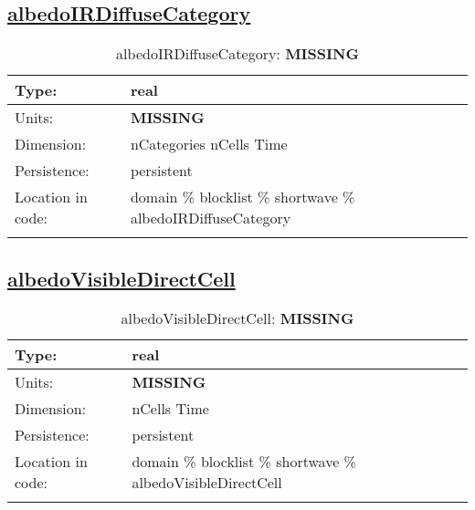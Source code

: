 \subsection[albedoIRDiffuseCategory]{\hyperref[sec:var_tab_shortwave]{albedoIRDiffuseCategory}}
\label{subsec:var_sec_shortwave_albedoIRDiffuseCategory}
\begin{center}
\begin{longtable}{| p{2.0in} | p{4.0in} |}
        \hline 
        Type: & real \\
        \hline 
        Units: & {\bf \color{red} MISSING} \\
        \hline 
        Dimension: & nCategories nCells Time \\
        \hline 
        Persistence: & persistent \\
        \hline 
         Location in code: & domain \% blocklist \% shortwave \% albedoIRDiffuseCategory \\
         \hline 
    \caption{albedoIRDiffuseCategory: {\bf \color{red} MISSING}}
\end{longtable}
\end{center}
\subsection[albedoVisibleDirectCell]{\hyperref[sec:var_tab_shortwave]{albedoVisibleDirectCell}}
\label{subsec:var_sec_shortwave_albedoVisibleDirectCell}
\begin{center}
\begin{longtable}{| p{2.0in} | p{4.0in} |}
        \hline 
        Type: & real \\
        \hline 
        Units: & {\bf \color{red} MISSING} \\
        \hline 
        Dimension: & nCells Time \\
        \hline 
        Persistence: & persistent \\
        \hline 
         Location in code: & domain \% blocklist \% shortwave \% albedoVisibleDirectCell \\
         \hline 
    \caption{albedoVisibleDirectCell: {\bf \color{red} MISSING}}
\end{longtable}
\end{center}
